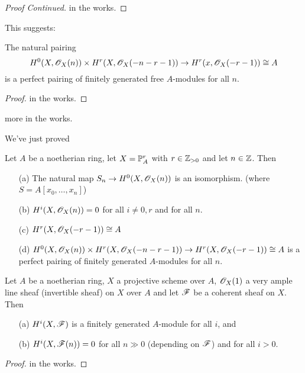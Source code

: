  \setcounter{lecture}{14}

 \begin{proof}[Proof Continued]
 in the works.
 \end{proof}

This suggests:
 \begin{theorem}
 The natural pairing
 \[
    H^0(X,\O_X(n))\times H^r(X,\O_X(-n-r-1)) \to H^r(x,\O_X(-r-1))
    \cong A
 \]
 is a perfect pairing of finitely generated free $A$-modules for
 all $n$.
 \end{theorem}
 \begin{proof}
 in the works.
 \end{proof}
 more in the works.

 We've just proved
 \begin{theorem}[III.5.1]
 Let $A$ be a noetherian ring, let $X=\P^r_A$ with $r\in \Z_{>0}$
 and let $n\in \Z$.  Then
 \begin{itemize}
 \item[(a)] The natural map $S_n\to H^0(X,\O_X(n))$ is an isomorphism.
 (where $S=A[x_0,\dots,x_n]$)
 \item[(b)] $H^i(X,\O_X(n))=0$ for all $i\not= 0,r$ and for all $n$.
 \item[(c)] $H^r(X,\O_X(-r-1))\cong A$
 \item[(d)] $H^0(X,\O_X(n)) \times H^r(X,\O_X(-n-r-1))\to
 H^r(X,\O_X(-r-1)) \cong A$ is a perfect pairing of finitely
 generated $A$-modules for all $n$.
 \end{itemize}
 \end{theorem}

 \begin{theorem}\label{T:III.5.2}
 Let $A$ be a noetherian ring, $X$ a projective scheme over $A$,
 $\O_X(1)$ a very ample line sheaf (invertible sheaf) on $X$ over
 $A$ and let $\F$ be a coherent sheaf on $X$.  Then
 \begin{itemize}
 \item[(a)] $H^i(X,\F)$ is a finitely generated $A$-module for all
 $i$, and
 \item[(b)] $H^i(X,\F(n))=0$ for all $n\gg 0$ (depending on $\F$)
 and for all $i>0$.
 \end{itemize}
 \end{theorem}
 \begin{proof}
 in the works.
 \renewcommand{\qedsymbol}{\text{\tiny proof continued in next
lecture}}
 \end{proof}
